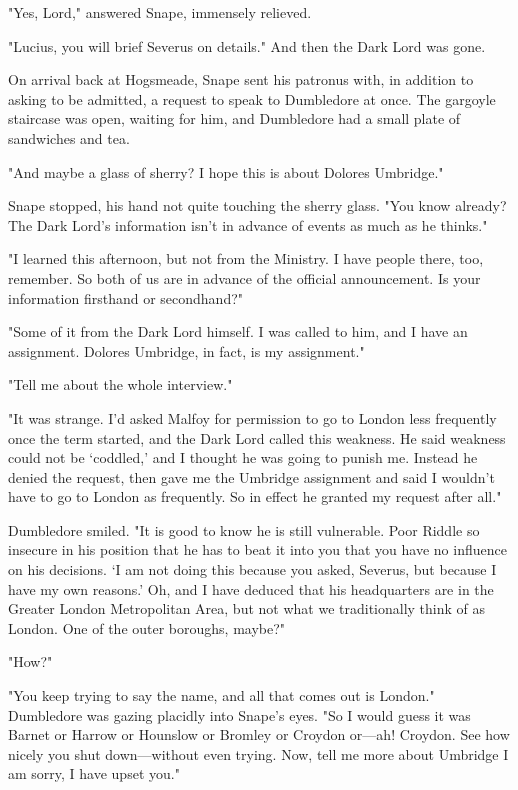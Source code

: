 "Yes, Lord," answered Snape, immensely relieved.

"Lucius, you will brief Severus on details." And then the Dark Lord was gone.

\sbreak

On arrival back at Hogsmeade, Snape sent his patronus with, in addition to asking to be admitted, a request to speak to Dumbledore at once. The gargoyle staircase was open, waiting for him, and Dumbledore had a small plate of sandwiches and tea.

"And maybe a glass of sherry? I hope this is about Dolores Umbridge."

Snape stopped, his hand not quite touching the sherry glass. "You know already? The Dark Lord's information isn't in advance of events as much as he thinks."

"I learned this afternoon, but not from the Ministry. I have people there, too, remember. So both of us are in advance of the official announcement. Is your information firsthand or secondhand?"

"Some of it from the Dark Lord himself. I was called to him, and I have an assignment. Dolores Umbridge, in fact, is my assignment."

"Tell me about the whole interview."

"It was strange. I'd asked Malfoy for permission to go to{\el} London less frequently once the term started, and the Dark Lord called this weakness. He said weakness could not be `coddled,' and I thought he was going to punish me. Instead he denied the request, then gave me the Umbridge assignment and said I wouldn't have to go to{\el} London as frequently. So in effect he granted my request after all."

Dumbledore smiled. "It is good to know he is still vulnerable. Poor Riddle{\el} so insecure in his position that he has to beat it into you that you have no influence on his decisions. `I am not doing this because you asked, Severus, but because I have my own reasons.' Oh, and I have deduced that his headquarters are in the Greater London Metropolitan Area, but not what we traditionally think of as London. One of the outer boroughs, maybe?"

"How{\el}?"

"You keep trying to say the name, and all that comes out is London." Dumbledore was gazing placidly into Snape's eyes. "So I would guess it was Barnet{\el} or Harrow{\el} or Hounslow{\el} or Bromley{\el} or Croydon{\el} or—ah! Croydon. See how nicely you shut down—without even trying. Now, tell me more about Umbridge{\el} I am sorry, I have upset you."


